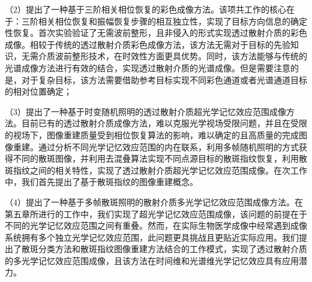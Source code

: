 （2）提出了一种基于三阶相关相位恢复的彩色成像方法。该项共工作的核心在于：三阶相关相位恢复和振幅恢复步骤的相互独立性，实现了目标方向信息的确定性恢复。首次实验验证了无需波前整形，且非侵入的形式实现透过散射介质的彩色成像。相较于传统的透过散射介质彩色成像方法，该方法无需对于目标的先验知识，无需介质波前整形技术，在时效性方面更具优势。同时，该方法能够与传统的光谱成像方法进行有效的结合，实现透过散射介质的光谱成像。但是需要注意的是，对于复杂目标，该方法需要借助参考目标实现不同彩色通道或者光谱通道目标的相对位置确定；

（3）提出了一种基于时变随机照明的透过散射介质超光学记忆效应范围成像方法。目前已有的透过散射介质成像方法，难以克服光学视场受限问题，并且在受限的视场下，图像重建质量受到相位恢复算法的影响，难以确定的且高质量的完成图像重建。通过分析不同光学记忆效应范围的内在联系，利用多帧随机照明的方式获得不同的散斑图像，并利用去混叠算法实现不同点源目标的散斑指纹恢复，利用散斑指纹之间的相关特性，实现了透过散射介质超光学记忆效应范围成像。在次工作中，我们首先提出了基于散斑指纹的图像重建概念。

（4）提出了一种基于多帧散斑照明的散射介质多光学记忆效应范围成像方法。在第五章所进行的工作中，我们实现了超光学记忆效应范围成像，该问题的前提在于不同的光学记忆效应范围之间有重叠。然而，在实际生物医学成像中经常遇到成像系统拥有多个独立光学记忆效应范围，此问题更具挑战且更贴近实际应用。我们提出了散斑分类方法和散斑指纹图像重建方法结合的工作模式，实现了透过散射介质的多光学记忆效应范围成像，且该方法在时间维和光谱维光学记忆效应具有应用潜力。
